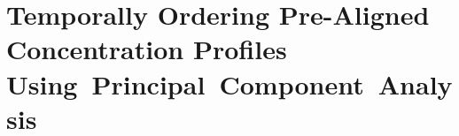 \section[Concentration Profiles and Principal Component Analysis]{Temporally Ordering Pre-Aligned Concentration Profiles Using~Principal~Component~Analysis}

%
%
%
%
%
%
%
%
%   
%      
